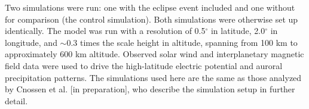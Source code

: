 Two simulations were run: one with the eclipse event included and one without for comparison (the control simulation). Both simulations were otherwise set up identically. The model was run with a resolution of 0.5$^\circ$ in latitude, 2.0$^\circ$ in longitude, and $\sim$0.3 times the scale height in altitude, spanning from 100 km to approximately 600 km altitude. Observed solar wind and interplanetary magnetic field data were used to drive the high-latitude electric potential and auroral precipitation patterns. The simulations used here are the same as those analyzed by Cnossen et al. [in preparation], who describe the simulation setup in further detail. 

